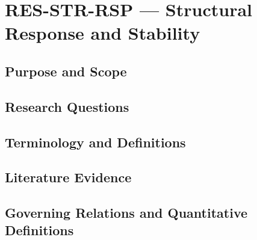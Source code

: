 
\section{RES-STR-RSP --- Structural Response and Stability}
\label{sec:res-str-rsp}

\subsection{Purpose and Scope}
\label{sec:res-str-rsp-purpose}


\subsection{Research Questions}
\label{sec:res-str-rsp-research-questions}


\subsection{Terminology and Definitions}
\label{sec:res-str-rsp-definitions}


\subsection{Literature Evidence}
\label{sec:res-str-rsp-literature-evidence}

%

\subsection{Governing Relations and Quantitative Definitions}
\label{sec:res-str-rsp-governing-relations}

